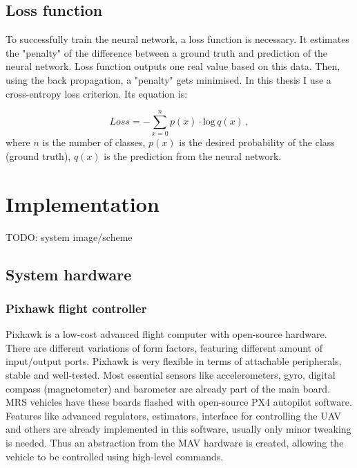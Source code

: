 \section{Loss function}

To successfully train the neural network, a loss function is necessary. It estimates the "penalty" of the difference between a ground truth and prediction of the neural network. Loss function outputs one real value based on this data. Then, using the back propagation, a "penalty" gets minimised. In this thesis I use a cross-entropy loss criterion. Its equation is:

\begin{equation}
	Loss = -\sum\limits_{x=0}^n p(x)\cdot \textrm{log} \,q(x) \,,
\end{equation}
where $n$ is the number of classes, $p(x)$ is the desired probability of the class (ground truth), $q(x)$ is the prediction from the neural network.




\chapter{Implementation}

TODO: system image/scheme

\section{System hardware}

\subsection{Pixhawk flight controller}

Pixhawk is a low-cost advanced flight computer with open-source hardware. There are different variations of form factors, featuring different amount of input/output ports. Pixhawk is very flexible in terms of attachable peripherals, stable and well-tested. Most essential sensors like accelerometers, gyro, digital compass (magnetometer) and barometer are already part of the main board. \acs{MRS} vehicles have these boards flashed with open-source PX4 autopilot software. Features like advanced regulators, estimators, interface for controlling the \acs{UAV} and others are already implemented in this software, usually only minor tweaking is needed. Thus an abstraction from the \acs{MAV} hardware is created, allowing the vehicle to be controlled using high-level commands.



